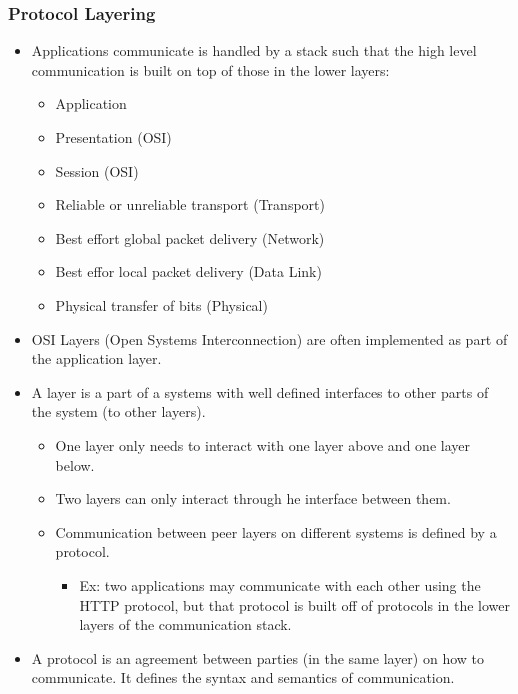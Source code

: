 \documentclass[]{article}
\providecommand{\tightlist}{%
  \setlength{\itemsep}{0pt}\setlength{\parskip}{0pt}}
\begin{document}
\hypertarget{protocol-layering}{%
\subsubsection{Protocol Layering}\label{protocol-layering}}

\begin{itemize}
\tightlist
\item
  Applications communicate is handled by a stack such that the high
  level communication is built on top of those in the lower layers:

  \begin{itemize}
  \tightlist
  \item
    Application
  \item
    Presentation (OSI)
  \item
    Session (OSI)
  \item
    Reliable or unreliable transport (Transport)
  \item
    Best effort global packet delivery (Network)
  \item
    Best effor local packet delivery (Data Link)
  \item
    Physical transfer of bits (Physical)
  \end{itemize}
\item
  OSI Layers (Open Systems Interconnection) are often implemented as
  part of the application layer.
\item
  A layer is a part of a systems with well defined interfaces to other
  parts of the system (to other layers).

  \begin{itemize}
  \tightlist
  \item
    One layer only needs to interact with one layer above and one layer
    below.
  \item
    Two layers can only interact through he interface between them.
  \item
    Communication between peer layers on different systems is defined by
    a protocol.

    \begin{itemize}
    \tightlist
    \item
      Ex: two applications may communicate with each other using the
      HTTP protocol, but that protocol is built off of protocols in the
      lower layers of the communication stack.
    \end{itemize}
  \end{itemize}
\item
  A protocol is an agreement between parties (in the same layer) on how
  to communicate. It defines the syntax and semantics of communication.
\end{itemize}
\end{document}
